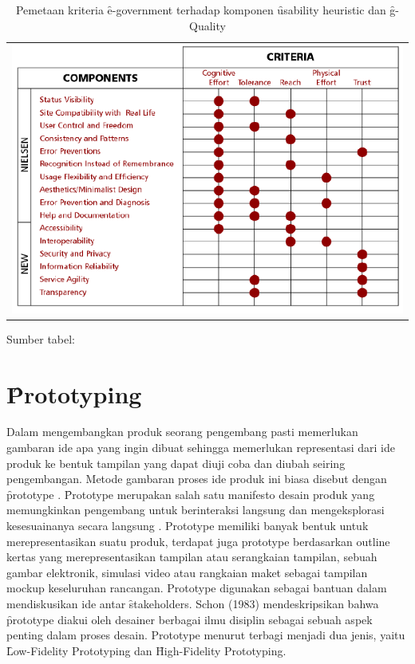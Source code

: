 \begin{table}
	\centering
	\caption{Pemetaan kriteria \f{e-government} terhadap komponen \f{usability heuristic} dan \f{g-Quality}}
	\label{tab:descgq}
	\begin{tabular}{c}
		\includegraphics[width=\textwidth]
		{pics/mappinggq.PNG}
	\end{tabular}
	\begin{center}
		{\small Sumber tabel: \citep{paper.garcia}}
	\end{center}
\end{table}
\section{\f{Prototyping}}
Dalam mengembangkan produk seorang pengembang pasti memerlukan gambaran ide apa yang ingin dibuat sehingga memerlukan representasi dari ide produk ke bentuk tampilan yang dapat diuji coba dan diubah seiring pengembangan. Metode gambaran proses ide produk ini biasa disebut dengan \f{prototype} . \f{Prototype} merupakan salah satu manifesto desain produk yang memungkinkan pengembang untuk berinteraksi langsung dan mengeksplorasi kesesuainanya secara langsung \citep{buku.preece}. Prototype memiliki banyak bentuk untuk merepresentasikan suatu produk, terdapat juga prototype berdasarkan outline kertas yang merepresentasikan tampilan atau serangkaian tampilan, sebuah gambar elektronik, simulasi video atau rangkaian maket sebagai tampilan mockup keseluruhan rancangan. Prototype digunakan sebagai bantuan dalam mendiskusikan ide antar \f{stakeholders}. Schon (1983) mendeskripsikan bahwa \f{prototype} diakui oleh desainer berbagai ilmu disiplin sebagai sebuah aspek penting dalam proses desain. Prototype menurut \citet{} terbagi menjadi dua jenis, yaitu \f{Low-Fidelity Prototyping} dan \f{High-Fidelity Prototyping}.

